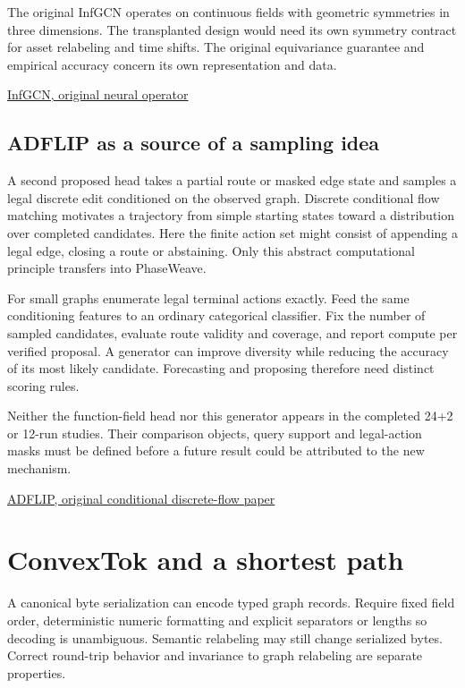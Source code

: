 \documentclass[11pt,oneside,openany]{book}
\begin{document}
The original InfGCN operates on continuous fields with geometric symmetries in three dimensions. The transplanted design would need its own symmetry contract for asset relabeling and time shifts. The original equivariance guarantee and empirical accuracy concern its own representation and data.

{\small\sffamily\href{https://arxiv.org/abs/2311.10908}{InfGCN, original neural operator}\par}
\section*{ADFLIP as a source of a sampling idea}
A second proposed head takes a partial route or masked edge state and samples a legal discrete edit conditioned on the observed graph. Discrete conditional flow matching motivates a trajectory from simple starting states toward a distribution over completed candidates. Here the finite action set might consist of appending a legal edge, closing a route or abstaining. Only this abstract computational principle transfers into PhaseWeave.

For small graphs enumerate legal terminal actions exactly. Feed the same conditioning features to an ordinary categorical classifier. Fix the number of sampled candidates, evaluate route validity and coverage, and report compute per verified proposal. A generator can improve diversity while reducing the accuracy of its most likely candidate. Forecasting and proposing therefore need distinct scoring rules.

Neither the function-field head nor this generator appears in the completed 24+2 or 12-run studies. Their comparison objects, query support and legal-action masks must be defined before a future result could be attributed to the new mechanism.

{\small\sffamily\href{https://proceedings.mlr.press/v267/yi25a.html}{ADFLIP, original conditional discrete-flow paper}\par}
\chapter{ConvexTok and a shortest path}
A canonical byte serialization can encode typed graph records. Require fixed field order, deterministic numeric formatting and explicit separators or lengths so decoding is unambiguous. Semantic relabeling may still change serialized bytes. Correct round-trip behavior and invariance to graph relabeling are separate properties.
\end{document}
